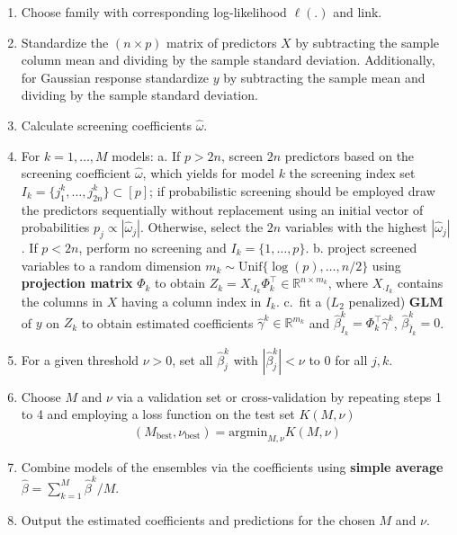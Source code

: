 \documentclass[
  article]{jss}
\begin{document}
\begin{enumerate}
\def\labelenumi{\arabic{enumi}.}
\item
  Choose family with corresponding log-likelihood \(\ell(.)\) and link.
\item
  Standardize the \((n\times p)\) matrix of predictors \(X\) by
  subtracting the sample column mean and dividing by the sample standard
  deviation. Additionally, for Gaussian response standardize \(y\) by
  subtracting the sample mean and dividing by the sample standard
  deviation.
\item
  Calculate screening coefficients \(\hat\omega\).
\item
  For \(k=1,\dots,M\) models: a. If \(p>2n\), screen \(2n\) predictors
  based on the screening coefficient \(\hat\omega\), which yields for
  model \(k\) the screening index set
  \(I_k=\{j_1^k,\dots,j_{2n}^k\}\subset[p]\); if probabilistic screening
  should be employed draw the predictors sequentially without
  replacement using an initial vector of probabilities
  \(p_j\propto |\hat\omega_j|\). Otherwise, select the \(2n\) variables
  with the highest \(|\hat\omega_j|\). If \(p < 2n\), perform no
  screening and \(I_k=\{1,\dots,p\}\). b. project screened variables to
  a random dimension \(m_k\sim \text{Unif}\{\log(p),\dots,n/2\}\) using
  \textbf{projection matrix} \(\Phi_k\) to obtain
  \(Z_k=X_{\cdot I_k}\Phi_k^\top \in \mathbb{R}^{n\times m_k}\), where
  \(X_{\cdot I_k}\) contains the columns in \(X\) having a column index
  in \(I_k\). c.~fit a (\(L_2\) penalized) \textbf{GLM} of \(y\) on
  \(Z_k\) to obtain estimated coefficients
  \(\widehat\gamma^k\in\mathbb{R}^{m_k}\) and
  \(\hat \beta_{I_k}^k=\Phi_k^\top\widehat\gamma^k\),
  \(\hat \beta_{\bar I_k}^k=0\).
\item
  For a given threshold \(\nu>0\), set all \(\hat\beta_j^k\) with
  \(|\hat\beta_j^k|<\nu\) to \(0\) for all \(j,k\).
\item
  Choose \(M\) and \(\nu\) via a validation set or cross-validation by
  repeating steps 1 to 4 and employing a loss function on the test set
  \(K(M, \nu)\) \begin{align*}
      (M_{\text{best}},\nu_{\text{best}}) = \text{argmin}_{M,\nu}K(M,\nu)
    \end{align*}
\item
  Combine models of the ensembles via the coefficients using
  \textbf{simple average} \(\hat \beta = \sum_{k=1}^M\hat \beta^k / M\).
\item
  Output the estimated coefficients and predictions for the chosen \(M\)
  and \(\nu\).
\end{enumerate}
\end{document}
